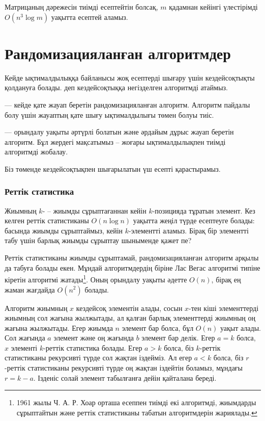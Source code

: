 Матрицаның дәрежесін тиімді есептейтін болсақ, 
$m$ қадамнан кейінгі үлестірімді $O(n^3 \log m)$ уақытта
есептей аламыз. 

\section{Рандомизацияланған алгоритмдер}


Кейде ықтималдылыққа байланысы жоқ есептерді шығару
үшін кездейсоқтықты қолдануға болады.  деп кездейсоқтыққа негізделген алгоритмді атаймыз. 


 –– кейде қате жауап
беретін рандомизацияланған алгоритм. Алгоритм пайдалы 
болу үшін жауаптың қате шығу ықтималдылығы төмен болуы 
тиіс.


 –– орындалу уақыты әртүрлі болатын және
әрдайым дұрыс жауап беретін алгоритм. Бұл жердегі мақсатымыз --
жоғары ықтималдылықпен тиімді алгоритмді жобалау. 

Біз төменде кездейсоқтықпен шығарылатын үш есепті қарастырамыз. 

\subsubsection{Реттік статистика}


Жиымның $k$- --
жиымды сұрыптағаннан кейін $k$-позицияда тұратын
элемент. Кез келген реттік статистиканы 
$O(n \log n)$ уақытта жеңіл түрде есептеуге болады:
басында жиымды сұрыптаймыз, кейін $k$-элементті аламыз. 
Бірақ бір элементті табу үшін барлық жиымды сұрыптау 
шыныменде қажет пе?

Реттік статистиканы жиымды сұрыптамай, рандомизацияланған 
алгоритм арқылы да табуға болады екен. Мұндай алгоритмдердің біріне Лас Вегас алгоритмі типіне кіретін  алгоритмі жатады\footnote{1961 жылы
Ч. А. Р. Хоар орташа есеппен тиімді екі алгоритмді,  
жиымдарды сұрыптайтын  \cite{hoa61a} және
реттік статистиканы табатын
 \cite{hoa61b} алгоритмдерін жариялады.}.
Оның орындалу уақыты әдетте $O(n)$, бірақ ең жаман жағдайда $O(n^2)$ болады.

Алгоритм жиымның $x$ кездейсоқ элементін алады, сосын
$x$-тен кіші элементтерді жиымның сол жағына жылжытады, ал қалған барлық элементтерді жиымның оң жағына жылжытады.
Егер жиымда $n$ элемент бар болса, бұл $O(n)$ уақыт алады. 
Сол жағында $a$ элемент және оң жағында $b$ элемент бар делік.
Егер $a=k$ болса, $x$ элементі $k$-реттік статистика болады. 
Егер $a>k$ болса, біз $k$-реттік статистиканы рекурсивті
түрде сол жақтан іздейміз. Ал егер $a<k$ болса,
біз $r$-реттік статистиканы рекурсивті түрде оң жақтан
іздейтін боламыз, мұндағы $r=k-a$. Ізденіс солай элемент 
табылғанға дейін қайталана береді. 

